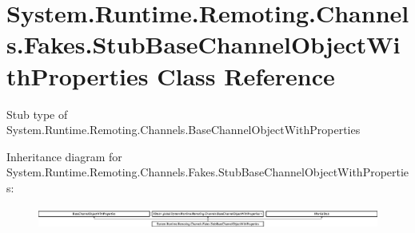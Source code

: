 \hypertarget{class_system_1_1_runtime_1_1_remoting_1_1_channels_1_1_fakes_1_1_stub_base_channel_object_with_properties}{\section{System.\-Runtime.\-Remoting.\-Channels.\-Fakes.\-Stub\-Base\-Channel\-Object\-With\-Properties Class Reference}
\label{class_system_1_1_runtime_1_1_remoting_1_1_channels_1_1_fakes_1_1_stub_base_channel_object_with_properties}
}


Stub type of System.\-Runtime.\-Remoting.\-Channels.\-Base\-Channel\-Object\-With\-Properties 


Inheritance diagram for System.\-Runtime.\-Remoting.\-Channels.\-Fakes.\-Stub\-Base\-Channel\-Object\-With\-Properties\-:\begin{figure}[H]
\begin{center}
\leavevmode
\includegraphics[height=0.734908cm]{class_system_1_1_runtime_1_1_remoting_1_1_channels_1_1_fakes_1_1_stub_base_channel_object_with_properties}
\end{center}
\end{figure}
